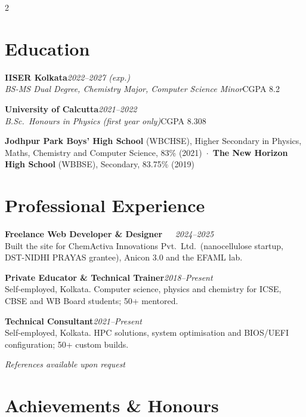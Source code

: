 \documentclass[a4paper,10.5pt]{extarticle}
\newcommand{\entry}[3]{%
  {\normalsize\textbf{#1}}\hfill{\small\itshape\textcolor{mutedtext}{#2}}\\[0.04em]
  {\small #3}\par\vspace{3pt}%
}
\newcommand{\eduentry}[4]{%
  {\normalsize\textbf{#1}}\hfill{\small\itshape\textcolor{mutedtext}{#2}}\\[0.04em]
  {\small\itshape #3}\hfill{\small #4}\par\vspace{3pt}%
}
\begin{document}
\begin{paracol}{2}
\section{Education}

\eduentry{IISER Kolkata}{2022--2027 (exp.)}{BS-MS Dual Degree, Chemistry Major, Computer Science Minor}{CGPA 8.2}

\eduentry{University of Calcutta}{2021--2022}{B.Sc.\ Honours in Physics (first year only)}{CGPA 8.308}

{\small\textbf{Jodhpur Park Boys' High School} (WBCHSE), Higher Secondary in Physics, Maths, Chemistry and Computer Science, 83\% (2021)~$\cdot$~\textbf{The New Horizon High School} (WBBSE), Secondary, 83.75\% (2019)}

\section{Professional Experience}

\entry{Freelance Web Developer \& Designer \href{https://chemactiva.com/}{\faGlobe}~\href{https://anicon3.github.io/}{\faGlobe}~\href{https://shuvam-banerji-seal.github.io/EFAML_WEB/index.html}{\faGlobe}}{2024--2025}{%
Built the site for ChemActiva Innovations Pvt.\ Ltd.\ (nanocellulose startup, DST-NIDHI PRAYAS grantee), Anicon 3.0 and the EFAML lab.}

\entry{Private Educator \& Technical Trainer}{2018--Present}{%
Self-employed, Kolkata. Computer science, physics and chemistry for ICSE, CBSE and WB Board students; 50+ mentored.}

\entry{Technical Consultant}{2021--Present}{%
Self-employed, Kolkata. HPC solutions, system optimisation and BIOS/UEFI configuration; 50+ custom builds.}

\begin{flushright}
{\small\itshape References available upon request}
\end{flushright}

\switchcolumn

\section{Achievements \& Honours}


\end{paracol}
\end{document}
